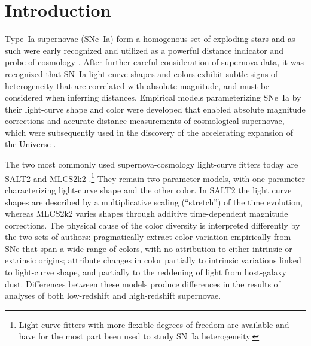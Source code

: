 \documentclass{aastex61}   	%
\begin{document}

\section{Introduction}
Type~Ia supernovae (SNe~Ia) form a homogenous set of exploding stars and as such were early recognized and utilized as a powerful distance indicator 
and probe of cosmology \citep[e.g.][]{1992ARA&A..30..359B, 1993ApJ...415....1S}.  After further careful consideration of supernova data, it was recognized
that SN~Ia light-curve shapes \citep{1993ApJ...413L.105P} and colors \citep{1996ApJ...473...88R, 1998A&A...331..815T} exhibit subtle signs of heterogeneity
that are correlated with absolute magnitude, and must be considered when inferring distances.  Empirical models parameterizing SNe~Ia by their light-curve shape \citep{1996ApJ...473...88R,
1997ApJ...483..565P,
1999ApJ...517..565P}
and color  \citep{1996ApJ...473...88R}  were developed that enabled absolute magnitude corrections
and accurate distance measurements of cosmological supernovae,
which 
were subsequently used in the discovery of the accelerating expansion of the Universe \citep{1998AJ....116.1009R,1999ApJ...517..565P}.

The two most commonly used supernova-cosmology light-curve fitters today are SALT2 \citep{2007A&A...466...11G} and MLCS2k2
\citep{2007ApJ...659..122J}.\footnote{Light-curve fitters with more flexible degrees of freedom
\citep[e.g.][]{2008ApJ...681..482C, 2011AJ....141...19B, 2011ApJ...731..120M} are available and have for
the most part been used to study SN~Ia heterogeneity.}
They remain two-parameter models, with one parameter characterizing light-curve shape and the other
 color.
In SALT2 the light curve shapes are described by a multiplicative scaling (``stretch'')  of the time evolution,
 whereas MLCS2k2 varies shapes through additive time-dependent magnitude corrections.
The physical cause of the color diversity is interpreted differently by the two sets of authors: 
\citet{2007A&A...466...11G} pragmatically extract color variation empirically from SNe that span a wide range of colors, with no attribution
to either intrinsic or extrinsic origins;
\citet{2007ApJ...659..122J}
attribute changes in color
partially to intrinsic variations linked to light-curve shape, and partially
to the reddening of light from host-galaxy dust.  Differences between these models produce differences in the results of
analyses of both low-redshift \citep{2007ApJ...664L..13C} and high-redshift \citep{2009ApJS..185...32K} supernovae.
\end{document}
